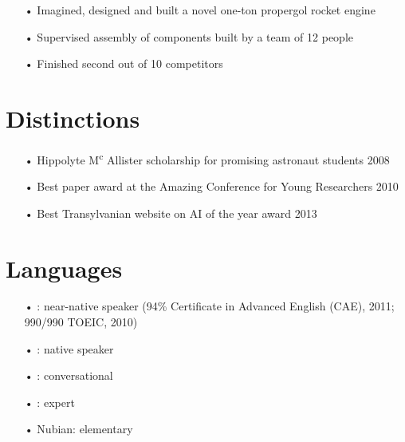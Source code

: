 \documentclass{cv}
\begin{document}
		\vspace{0.3\baselineskip} %

		\begin{position}[title={Sub-ton liquid-fuel rocket student competition},%
		                 institution={Insitute for Advanced Rocket Design, Baïkal},%
		                 country=Russia,%
		                 from=2003,%
		                 to=2004]
			\vspace{-\baselineskip} %
			\begin{itemize}
				\item[•] Imagined, designed and built a novel one-ton propergol rocket engine
				\item[•] Supervised assembly of components built by a team of 12 people
				\item[•] Finished second out of 10 competitors
			\end{itemize}
		\end{position}

	\section{Distinctions}
		\begin{itemize}
			\vspace{-\baselineskip} %
			\item[•] Hippolyte M\textsuperscript{c} Allister scholarship for promising astronaut students \hfill 2008
			\item[•] Best paper award at the Amazing Conference for Young Researchers \hfill 2010
			\item[•] Best Transylvanian website on AI of the year award               \hfill 2013
		\end{itemize}

	\section{Languages}
		\begin{itemize}
			\vspace{-\baselineskip} %
			\item[•] : near-native speaker (94\% Certificate in Advanced English (CAE), 2011; 990/990 TOEIC, 2010)
			\item[•] : native speaker
			\item[•] : conversational
			\item[•] : expert
			\item[•] Nubian: elementary
		\end{itemize}
\end{document}
